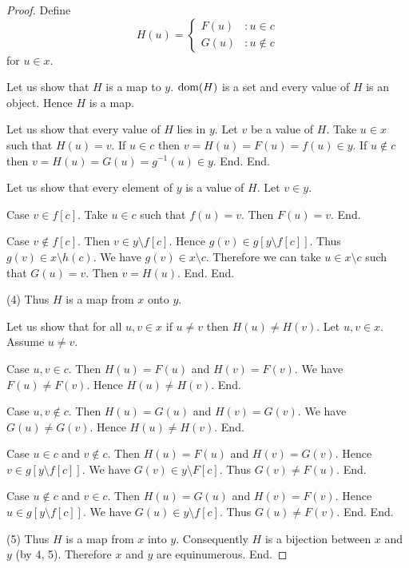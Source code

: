 \documentclass[../set-theory.tex]{subfiles}
\begin{document}
\begin{forthel}
\begin{proof}
        Define \[ H(u) =
          \begin{cases}
            F(u) & : u \in c \\
            G(u) & : u \notin c
          \end{cases} \]
        for $u \in x$.

        Let us show that $H$ is a map to $y$.
          $\operatorname{dom}(H)$ is a set and every value of $H$ is an object.
          Hence $H$ is a map.

          Let us show that every value of $H$ lies in $y$.
            Let $v$ be a value of $H$.
            Take $u \in x$ such that $H(u) = v$.
            If $u \in c$ then $v = H(u) = F(u) = f(u) \in y$.
            If $u \notin c$ then $v = H(u) = G(u) = g^{-1}(u) \in y$.
          End.
        End.

        Let us show that every element of $y$ is a value of $H$.
          Let $v \in y$.

          Case $v \in f[c]$.
            Take $u \in c$ such that $f(u) = v$.
            Then $F(u) = v$.
          End.

          Case $v \notin f[c]$.
            Then $v \in y \setminus f[c]$.
            Hence $g(v) \in g[y \setminus f[c]]$.
            Thus $g(v) \in x \setminus h(c)$.
            We have $g(v) \in x \setminus c$.
            Therefore we can take $u \in x \setminus c$ such that $G(u) = v$.
            Then $v = H(u)$.
          End.
        End.

        (4) Thus $H$ is a map from $x$ onto $y$.

        Let us show that for all $u, v \in x$ if $u \neq v$ then
        $H(u) \neq H(v)$.
          Let $u,v \in x$.
          Assume $u \neq v$.

          Case $u,v \in c$.
            Then $H(u) = F(u)$ and $H(v) = F(v)$.
            We have $F(u) \neq F(v)$.
            Hence $H(u) \neq H(v)$.
          End.

          Case $u,v \notin c$.
            Then $H(u) = G(u)$ and $H(v) = G(v)$.
            We have $G(u) \neq G(v)$.
            Hence $H(u) \neq H(v)$.
          End.

          Case $u \in c$ and $v \notin c$.
            Then $H(u) = F(u)$ and $H(v) = G(v)$.
            Hence $v \in g[y \setminus f[c]]$.
            We have $G(v) \in y \setminus F[c]$.
            Thus $G(v) \neq F(u)$.
          End.

          Case $u \notin c$ and $v \in c$.
            Then $H(u) = G(u)$ and $H(v) = F(v)$.
            Hence $u \in g[y \setminus f[c]]$.
            We have $G(u) \in y \setminus f[c]$.
            Thus $G(u) \neq F(v)$.
          End.
        End.

        (5) Thus $H$ is a map from $x$ into $y$.
        Consequently $H$ is a bijection between $x$ and $y$ (by 4, 5).
        Therefore $x$ and $y$ are equinumerous.
      End.
    \end{proof}
  \end{forthel}
\end{document}
